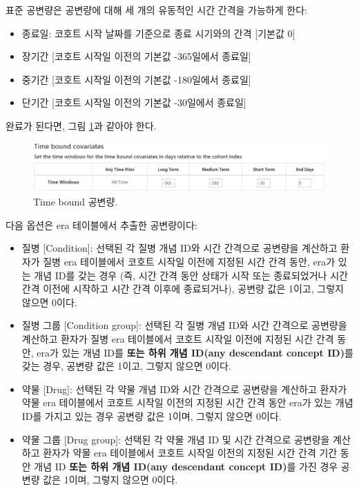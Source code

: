 \documentclass[11pt]{book}
\providecommand{\tightlist}{%
  \setlength{\itemsep}{0pt}\setlength{\parskip}{0pt}}
\theoremstyle{definition}
\theoremstyle{definition}
\theoremstyle{definition}
\theoremstyle{remark}
\begin{document}
표준 공변량은 공변량에 대해 세 개의 유동적인 시간 간격을 가능하게 한다:

\begin{itemize}
\tightlist
\item
  종료일: 코호트 시작 날짜를 기준으로 종료 시기와의 간격 {[}기본값 0{]}
\item
  장기간 {[}코호트 시작일 이전의 기본값 -365일에서 종료일{]}
\item
  중기간 {[}코호트 시작일 이전의 기본값 -180일에서 종료일{]}
\item
  단기간 {[}코호트 시작일 이전의 기본값 -30일에서 종료일{]}
\end{itemize}

완료가 된다면, 그림 \ref{fig:covariateSettings3}과 같아야 한다.

\begin{figure}

{\centering \includegraphics[width=1\linewidth]{images/PatientLevelPrediction/covariateSettings3} 

}

\caption{Time bound 공변량.}\label{fig:covariateSettings3}
\end{figure}

다음 옵션은 era 테이블에서 추출한 공변량이다:

\begin{itemize}
\tightlist
\item
  질병 {[}Condition{]}: 선택된 각 질병 개념 ID와 시간 간격으로 공변량을
  계산하고 환자가 질병 era 테이블에서 코호트 시작일 이전에 지정된 시간
  간격 동안, era가 있는 개념 ID를 갖는 경우 (즉, 시간 간격 동안 상태가
  시작 또는 종료되었거나 시간 간격 이전에 시작하고 시간 간격 이후에
  종료되거나), 공변량 값은 1이고, 그렇지 않으면 0이다.
\item
  질병 그룹 {[}Condition group{]}: 선택된 각 질병 개념 ID와 시간
  간격으로 공변량을 계산하고 환자가 질병 era 테이블에서 코호트 시작일
  이전에 지정된 시간 간격 동안, era가 있는 개념 ID를 \textbf{또는 하위
  개념 ID(any descendant concept ID)}를 갖는 경우, 공변량 값은 1이고,
  그렇지 않으면 0이다.
\item
  약물 {[}Drug{]}: 선택된 각 약물 개념 ID와 시간 간격으로 공변량을
  계산하고 환자가 약물 era 테이블에서 코호트 시작일 이전의 지정된 시간
  간격 동안 era가 있는 개념 ID를 가지고 있는 경우 공변량 값은 1이며,
  그렇지 않으면 0이다.
\item
  약물 그룹 {[}Drug group{]}: 선택된 각 약물 개념 ID 및 시간 간격으로
  공변량을 계산하고 환자가 약물 era 테이블에서 코호트 시작일 이전의
  지정된 시간 간격 기간 동안 개념 ID \textbf{또는 하위 개념 ID(any
  descendant concept ID)}를 가진 경우 공변량 값은 1이며, 그렇지 않으면
  0이다.
\end{itemize}
\end{document}
